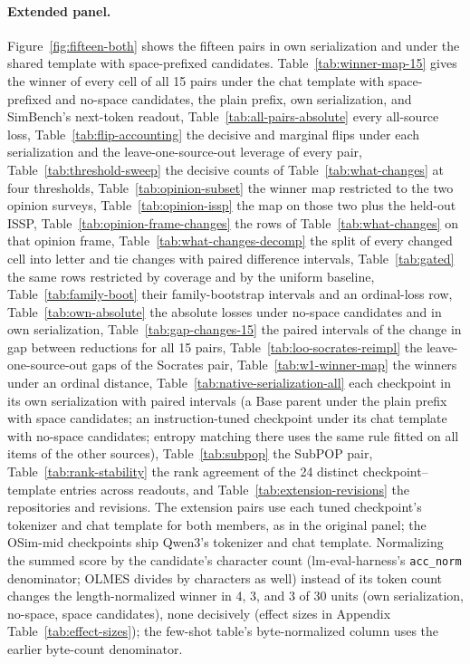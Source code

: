 \documentclass[11pt]{article}
\begin{document}
\paragraph{Extended panel.}
Figure~\ref{fig:fifteen-both} shows the fifteen pairs in own serialization and under the shared template with space-prefixed candidates. Table~\ref{tab:winner-map-15} gives the winner of every cell of all 15 pairs
under the chat template with space-prefixed and no-space candidates, the
plain prefix, own serialization, and SimBench's next-token readout,
Table~\ref{tab:all-pairs-absolute} every all-source loss,
Table~\ref{tab:flip-accounting} the decisive and marginal flips under each
serialization and the leave-one-source-out leverage of every pair,
Table~\ref{tab:threshold-sweep} the decisive counts of
Table~\ref{tab:what-changes} at four thresholds,
Table~\ref{tab:opinion-subset} the winner map restricted to the two opinion
surveys, Table~\ref{tab:opinion-issp} the map on those two plus the
held-out ISSP, Table~\ref{tab:opinion-frame-changes} the rows of
Table~\ref{tab:what-changes} on that opinion frame,
Table~\ref{tab:what-changes-decomp} the split of every changed cell into
letter and tie changes with paired difference intervals,
Table~\ref{tab:gated} the same rows restricted by coverage and by the
uniform baseline, Table~\ref{tab:family-boot} their family-bootstrap
intervals and an ordinal-loss row, Table~\ref{tab:own-absolute} the
absolute losses under no-space candidates and in own serialization, Table~\ref{tab:gap-changes-15} the paired intervals of the
change in gap between reductions for all 15 pairs, Table~\ref{tab:loo-socrates-reimpl} the leave-one-source-out gaps of
the Socrates pair, Table~\ref{tab:w1-winner-map}
the winners under an ordinal distance, Table~\ref{tab:native-serialization-all} each checkpoint in its
own serialization with paired intervals (a Base parent under the plain
prefix with space candidates; an instruction-tuned checkpoint under its chat
template with no-space candidates; entropy matching there uses the same rule
fitted on all items of the other sources), Table~\ref{tab:subpop} the SubPOP
pair, Table~\ref{tab:rank-stability} the
rank agreement of the 24 distinct checkpoint--template entries across
readouts, and Table~\ref{tab:extension-revisions} the repositories and
revisions. The extension pairs use each
tuned checkpoint's tokenizer and chat template for both members, as in the
original panel; the OSim-mid checkpoints ship Qwen3's tokenizer and chat
template. Normalizing the summed score by the candidate's character count (lm-eval-harness's \texttt{acc\_norm} denominator; OLMES divides by characters as well) instead of its token count changes the length-normalized winner in 4, 3, and 3 of 30 units (own serialization, no-space, space candidates), none decisively (effect sizes in Appendix Table~\ref{tab:effect-sizes}); the few-shot table's byte-normalized column uses the earlier byte-count denominator.
\end{document}
